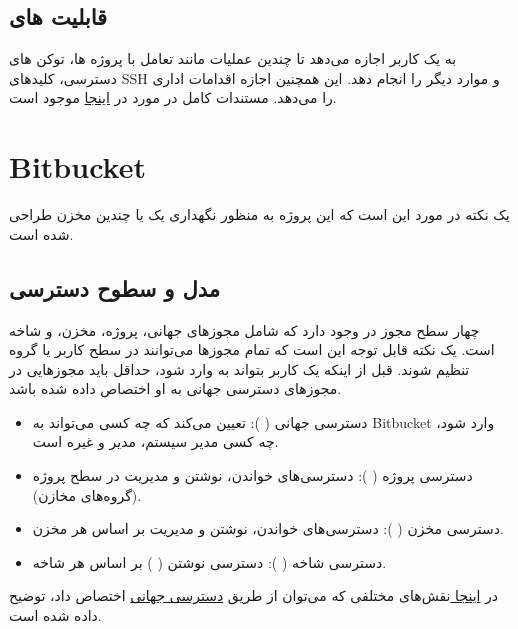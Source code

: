 \documentclass{CSICC}
\begin{document}
 \subsection{قابلیت ‌های 
 	}
 	به یک کاربر اجازه می‌دهد تا چندین عملیات مانند تعامل با پروژه‌ ها، توکن ‌های دسترسی، کلیدهای
 	 SSH
 	  و موارد دیگر را انجام دهد. این همچنین اجازه اقدامات اداری را می‌دهد.
 	مستندات کامل در مورد
 	  در 
 	  \href{https://docs.gitlab.com/ee/api/index.html}{اینجا}
 	   موجود است.
 	   
 	   \section{Bitbucket}
 	   یک نکته در مورد
 	   این است که این پروژه به منظور نگهداری یک یا چندین مخزن طراحی شده است.
 	   \subsection{مدل و سطوح دسترسی}
 	   
 	   چهار سطح مجوز در
 	   وجود دارد که شامل مجوزهای جهانی، پروژه، مخزن، و شاخه است. یک نکته قابل توجه این است که تمام مجوزها می‌توانند در سطح کاربر یا گروه تنظیم شوند. قبل از اینکه یک کاربر بتواند به
 	   وارد شود، حداقل باید مجوزهایی در مجوزهای دسترسی جهانی به او اختصاص داده شده باشد.
 	   
 	   \begin{itemize}
 	   	\item دسترسی جهانی (
 	   	): 
 	   	تعیین می‌کند که چه کسی می‌تواند به Bitbucket وارد شود، چه کسی مدیر سیستم، مدیر و غیره است.
 	   	\item 
 	   	دسترسی پروژه (
 	   	): 
 	   	دسترسی‌های خواندن، نوشتن و مدیریت در سطح پروژه (گروه‌های مخازن).
 	   	\item 
 	   	دسترسی مخزن (
 	   	):
 	   	دسترسی‌های خواندن، نوشتن و مدیریت بر اساس هر مخزن.
 	   	\item 
 	   	دسترسی شاخه (
 	   	):
 	   	دسترسی نوشتن (
 	   	) بر اساس هر شاخه.
 	   \end{itemize}
 	   
 	   
 	   
 	   در 
 	   \href{https://confluence.atlassian.com/bitbucketserver/global-permissions-776640369.html}{ اینجا
 	   }
 	   نقش‌های مختلفی که می‌توان از طریق \underline{دسترسی جهانی} اختصاص داد، توضیح داده شده است.
 	   
\end{document}
